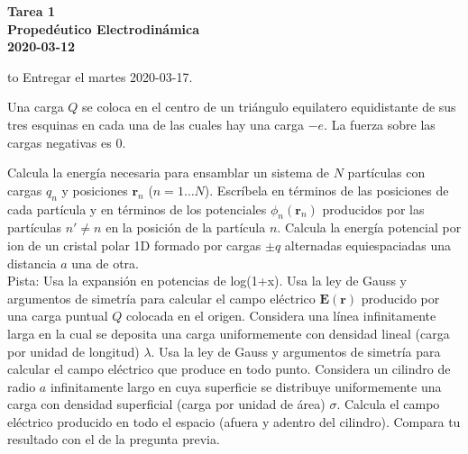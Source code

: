 \documentclass{exam}
\begin{document}
\begin{center}
\bf\large Tarea 1\\
Propedéutico Electrodinámica\\
2020-03-12
\\[20pt]

\end{center}
\hbox to \textwidth{Nombre: \enspace\hrulefill}
Entregar el martes 2020-03-17.

\begin{questions}
  \question Una carga $Q$ se coloca en el centro de un triángulo
  equilatero equidistante de sus tres esquinas en cada una de las
  cuales hay una carga $-e$. La
  fuerza sobre las cargas negativas es 0.
  \question Calcula la energía necesaria para ensamblar un sistema de
  $N$ partículas con cargas $q_n$ y posiciones $\bm r_n$
  ($n=1\ldots N$). Escríbela en términos de las posiciones de cada
  partícula y en términos de los potenciales $\phi_n(\bm r_n)$
  producidos por las partículas $n'\ne n$ en la posición de la
  partícula $n$.
  \question Calcula la energía potencial por ion de un cristal polar 1D
  formado por cargas $\pm q$ alternadas equiespaciadas una distancia $a$
  una de otra.\\Pista: Usa la expansión en potencias de log(1+x).
  \question Usa la ley de Gauss y argumentos de simetría para calcular
  el campo eléctrico $\bm E(\bm r)$ producido por una carga puntual
  $Q$ colocada en el origen.
  \question Considera una línea infinitamente larga en la
  cual se deposita una carga uniformemente con densidad lineal (carga
  por unidad de longitud) $\lambda$.
  Usa la ley de Gauss y argumentos de simetría para calcular el campo
  eléctrico que produce en todo punto.
  \question Considera un cilindro de radio $a$ infinitamente largo en
  cuya superficie se distribuye uniformemente una carga con densidad
  superficial (carga por unidad de área) $\sigma$. Calcula el campo
  eléctrico producido en todo el espacio (afuera y adentro del
  cilindro). Compara tu resultado con el de la pregunta previa.
  \question
  \begin{parts}

\end{parts}
\end{questions}
\end{document}
